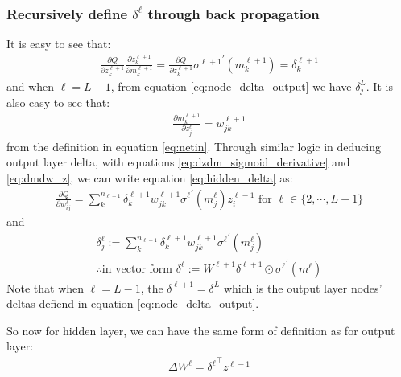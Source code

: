 \documentclass{article} [10pt] %
\begin{document}
\subsubsection{Recursively define $\delta^\ell$ through back propagation}
It is easy to see that:
\begin{align}
\frac{\partial Q}{\partial z^{\ell+1}_{k}}\frac{\partial z^{\ell+1}_{k}}{\partial m^{\ell+1}_{k}} = \frac{\partial Q}{\partial z^{\ell+1}_{k}}{\sigma^{\ell+1}}^\prime(m^{\ell+1}_{k}) = \delta^{\ell+1}_k
\end{align}
and when $\ell=L-1$, from equation \eqref{eq:node_delta_output} we have $\delta^L_j$. It is also easy to see that:
\begin{align}
	\frac{\partial m^{\ell+1}_{k}}{\partial z^\ell_j} = w^{\ell+1}_{jk}
\end{align}
from the definition in equation \eqref{eq:netin}. Through similar logic in deducing output layer delta, with equations \eqref{eq:dzdm_sigmoid_derivative}  and \eqref{eq:dmdw_z}, we can write equation \eqref{eq:hidden_delta} as:
\begin{align}
	\frac{\partial Q}{\partial w^\ell_{ij}} = \sum_k^{n_{\ell+1}}\delta^{\ell+1}_kw^{\ell+1}_{jk}
							{\sigma^{\ell}}^\prime(m^{\ell}_j)z^{\ell-1}_i
\text{ for } \ell \in \{2, \cdots, L-1\}
\end{align}
and 
\begin{align}
\boxed{
	\delta^\ell_j := \sum_k^{n_{\ell+1}}\delta^{\ell+1}_kw^{\ell+1}_{jk}{\sigma^{\ell}}^\prime(m^{\ell}_j)
} \\
\boxed{
	\therefore \text{in vector form }  \delta^\ell := W^{\ell+1}{\delta^{\ell+1}} \odot {\sigma^{\ell}}^\prime(m^{\ell})
}
\end{align}
Note that when $\ell=L-1$, the $\delta^{\ell+1}=\delta^L$ which is the output layer nodes' deltas defiend in equation \eqref{eq:node_delta_output}.

So now for hidden layer, we can have the same form of definition as for output layer:
\begin{align} \label{eq:delta_w_hidden}
\boxed{
	\Delta W^\ell = {\delta^{\ell}}^\top z^{\ell-1}
}
\end{align}
\end{document}

